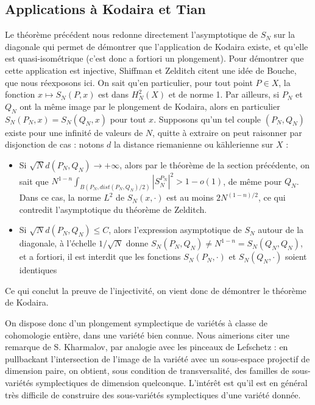 \subsection{Applications à Kodaira et Tian}
	Le théorème précédent nous redonne directement l'asymptotique de $S_N$ sur la diagonale qui permet de démontrer que l'application de Kodaira existe, et qu'elle est quasi-isométrique (c'est donc a fortiori un plongement). Pour démontrer que cette application est injective, Shiffman et Zelditch citent une idée de Bouche, que nous réexposons ici. On sait qu'en particulier, pour tout point $P \in X$, la fonction $x \mapsto S_N(P,x)$ est dans $H^2_N(X)$ et de norme 1. Par ailleurs, si $P_N$ et $Q_N$ ont la même image par le plongement de Kodaira, alors en particulier $S_N(P_N,x)=S_N(Q_N,x)$ pour tout $x$. Supposons qu'un tel couple $(P_N,Q_N)$ existe pour une infinité de valeurs de $N$, quitte à extraire on peut raisonner par disjonction de cas : notons $d$ la distance riemanienne ou k\"ahlerienne sur $X$ :
	
	\begin{itemize}
		\item Si $\sqrt{N}d(P_N,Q_N) \to +\infty$, alors par le théorème de la section précédente, on sait que $N^{1-n}\int_{B(P_N,dist(P_N,Q_N)/2)}|S_N^{P_N}|^2 > 1-o(1)$, de même pour $Q_N$. Dans ce cas, la norme $L^2$ de $S_N(x,\cdot)$ est au moins $2N^{(1-n)/2}$, ce qui contredit l'asymptotique du théorème de Zelditch.
		\item Si $\sqrt{N}d(P_N,Q_N) \leq C$, alors l'expression asymptotique de $S_N$ autour de la diagonale, à l'échelle $1/\sqrt{N}$ donne $S_N(P_N,Q_N)\neq N^{1-n}=S_N(Q_N,Q_N)$, et a fortiori, il est interdit que les fonctions $S_N(P_N,\cdot)$ et $S_N(Q_N,\cdot)$ soient identiques
	\end{itemize}

Ce qui conclut la preuve de l'injectivité, on vient donc de démontrer le théorème de Kodaira.

On dispose donc d'un plongement symplectique de variétés à classe de cohomologie entière, dans une variété bien connue. Nous aimerions citer une remarque de S. Kharmalov, par analogie avec les pinceaux de Lefschetz : en pullbackant l'intersection de l'image de la variété avec un sous-espace projectif de dimension paire, on obtient, sous condition de transversalité, des familles de sous-variétés symplectiques de dimension quelconque. L'intérêt est qu'il est en général très difficile de construire des sous-variétés symplectiques d'une variété donnée. 